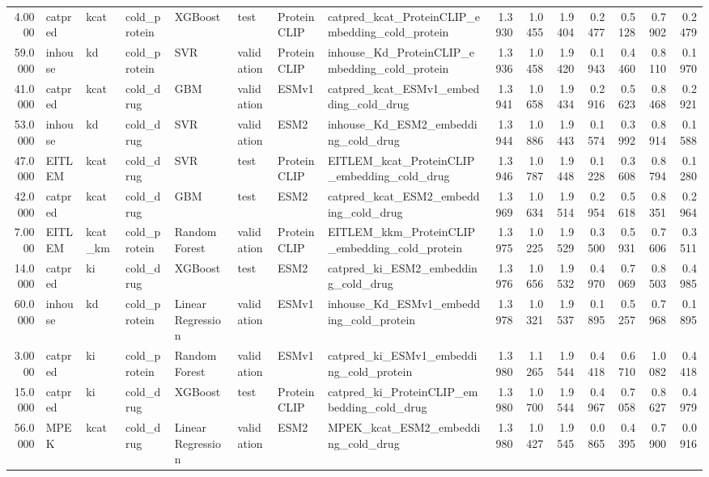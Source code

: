 \begin{tabular}{rlllllllrrrrrrr}
4.0000 & catpred & kcat & cold_protein & XGBoost & test & ProteinCLIP & catpred_kcat_ProteinCLIP_embedding_cold_protein & 1.3930 & 1.0455 & 1.9404 & 0.2477 & 0.5128 & 0.7902 & 0.2479 \\
59.0000 & inhouse & kd & cold_protein & SVR & validation & ProteinCLIP & inhouse_Kd_ProteinCLIP_embedding_cold_protein & 1.3936 & 1.0458 & 1.9420 & 0.1943 & 0.4460 & 0.8110 & 0.1970 \\
41.0000 & catpred & kcat & cold_drug & GBM & validation & ESMv1 & catpred_kcat_ESMv1_embedding_cold_drug & 1.3941 & 1.0658 & 1.9434 & 0.2916 & 0.5623 & 0.8468 & 0.2921 \\
53.0000 & inhouse & kd & cold_drug & SVR & validation & ESM2 & inhouse_Kd_ESM2_embedding_cold_drug & 1.3944 & 1.0886 & 1.9443 & 0.1574 & 0.3992 & 0.8914 & 0.1588 \\
47.0000 & EITLEM & kcat & cold_drug & SVR & test & ProteinCLIP & EITLEM_kcat_ProteinCLIP_embedding_cold_drug & 1.3946 & 1.0787 & 1.9448 & 0.1228 & 0.3608 & 0.8794 & 0.1280 \\
42.0000 & catpred & kcat & cold_drug & GBM & test & ESM2 & catpred_kcat_ESM2_embedding_cold_drug & 1.3969 & 1.0634 & 1.9514 & 0.2954 & 0.5618 & 0.8351 & 0.2964 \\
7.0000 & EITLEM & kcat_km & cold_protein & Random Forest & validation & ProteinCLIP & EITLEM_kkm_ProteinCLIP_embedding_cold_protein & 1.3975 & 1.0225 & 1.9529 & 0.3500 & 0.5931 & 0.7606 & 0.3511 \\
14.0000 & catpred & ki & cold_drug & XGBoost & test & ESM2 & catpred_ki_ESM2_embedding_cold_drug & 1.3976 & 1.0656 & 1.9532 & 0.4970 & 0.7069 & 0.8503 & 0.4985 \\
60.0000 & inhouse & kd & cold_protein & Linear Regression & validation & ESMv1 & inhouse_Kd_ESMv1_embedding_cold_protein & 1.3978 & 1.0321 & 1.9537 & 0.1895 & 0.5257 & 0.7968 & 0.1895 \\
3.0000 & catpred & ki & cold_protein & Random Forest & validation & ESMv1 & catpred_ki_ESMv1_embedding_cold_protein & 1.3980 & 1.1265 & 1.9544 & 0.4418 & 0.6710 & 1.0082 & 0.4418 \\
15.0000 & catpred & ki & cold_drug & XGBoost & test & ProteinCLIP & catpred_ki_ProteinCLIP_embedding_cold_drug & 1.3980 & 1.0700 & 1.9544 & 0.4967 & 0.7058 & 0.8627 & 0.4979 \\
56.0000 & MPEK & kcat & cold_drug & Linear Regression & validation & ESM2 & MPEK_kcat_ESM2_embedding_cold_drug & 1.3980 & 1.0427 & 1.9545 & 0.0865 & 0.4395 & 0.7900 & 0.0916 \\

\end{tabular}
